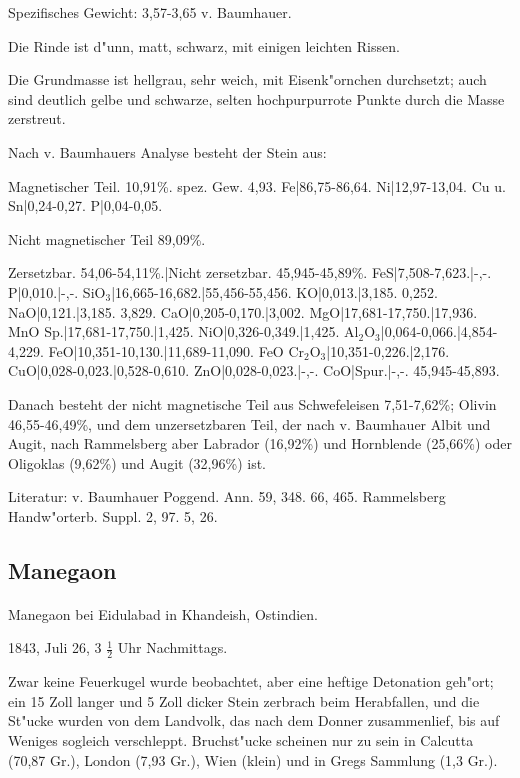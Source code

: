 \documentclass[a4paper, 11pt, oneside]{article}
\begin{document}
Spezifisches Gewicht: 3,57-3,65 v. Baumhauer.

Die Rinde ist d"unn, matt, schwarz, mit einigen leichten Rissen.

Die Grundmasse ist hellgrau, sehr weich, mit Eisenk"ornchen durchsetzt; auch sind deutlich gelbe und schwarze, selten hochpurpurrote Punkte durch die Masse zerstreut.

Nach v. Baumhauers Analyse besteht der Stein aus:

Magnetischer Teil. 10,91\%. spez. Gew. 4,93.  
Fe|86,75-86,64.  
Ni|12,97-13,04.  
Cu u. Sn|0,24-0,27.  
P|0,04-0,05.

Nicht magnetischer Teil 89,09\%.

Zersetzbar. 54,06-54,11\%.|Nicht zersetzbar. 45,945-45,89\%.  
FeS|7,508-7,623.|-,-.  
P|0,010.|-,-.  
SiO$_{3}$|16,665-16,682.|55,456-55,456.  
KO|0,013.|3,185. 0,252.  
NaO|0,121.|3,185. 3,829.  
CaO|0,205-0,170.|3,002.  
MgO|17,681-17,750.|17,936.  
MnO Sp.|17,681-17,750.|1,425.  
NiO|0,326-0,349.|1,425.  
Al$_{2}$O$_{3}$|0,064-0,066.|4,854-4,229.  
FeO|10,351-10,130.|11,689-11,090.  
FeO Cr$_{2}$O$_{3}$|10,351-0,226.|2,176.  
CuO|0,028-0,023.|0,528-0,610.  
ZnO|0,028-0,023.|-,-.  
CoO|Spur.|-,-.  
45,945-45,893.  

Danach besteht der nicht magnetische Teil aus Schwefeleisen 7,51-7,62\%; Olivin 46,55-46,49\%, und dem unzersetzbaren Teil, der nach v. Baumhauer Albit und Augit, nach Rammelsberg aber Labrador (16,92\%) und Hornblende (25,66\%) oder Oligoklas (9,62\%) und Augit (32,96\%) ist.

\footnotesize
Literatur: v. Baumhauer Poggend. Ann. 59, 348. 66, 465. Rammelsberg Handw"orterb. Suppl. 2, 97. 5, 26.

\subsection{Manegaon}
\normalsize
\paragraph{}
Manegaon bei Eidulabad in Khandeish, Ostindien.

1843, Juli 26, 3 $\frac{1}{2}$ Uhr Nachmittags.

Zwar keine Feuerkugel wurde beobachtet, aber eine heftige Detonation geh"ort; ein 15 Zoll langer und 5 Zoll dicker Stein zerbrach beim Herabfallen, und die St"ucke wurden von dem Landvolk, das nach dem Donner zusammenlief, bis auf Weniges sogleich verschleppt. Bruchst"ucke scheinen nur zu sein in Calcutta (70,87 Gr.), London (7,93 Gr.), Wien (klein) und in Gregs Sammlung (1,3 Gr.).
\end{document}
